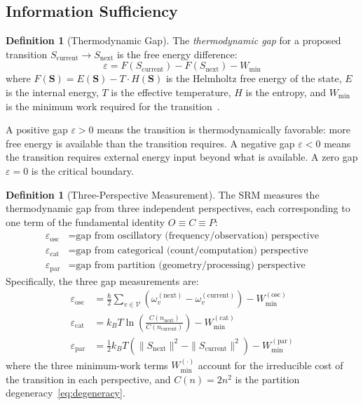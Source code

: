 \documentclass[twocolumn,10pt]{article}
\theoremstyle{definition}
\newtheorem{definition}[theorem]{Definition}
\newcommand{\Sentropy}{\mathbf{S}}
\newcommand{\Scurrent}{S_{\mathrm{current}}}
\newcommand{\Snext}{S_{\mathrm{next}}}
\begin{document}
\subsection{Information Sufficiency}

\begin{definition}[Thermodynamic Gap]
\label{def:thermo-gap}
The \emph{thermodynamic gap} for a proposed transition $\Scurrent \to \Snext$ is the free energy difference:
\begin{equation}
\varepsilon = F(\Scurrent) - F(\Snext) - W_{\mathrm{min}}
\end{equation}
where $F(\Sentropy) = E(\Sentropy) - T \cdot H(\Sentropy)$ is the Helmholtz free energy of the state, $E$ is the internal energy, $T$ is the effective temperature, $H$ is the entropy, and $W_{\mathrm{min}}$ is the minimum work required for the transition~\cite{landauer1961,bennett1982,jaynes1957}.
\end{definition}

A positive gap $\varepsilon > 0$ means the transition is thermodynamically favorable: more free energy is available than the transition requires. A negative gap $\varepsilon < 0$ means the transition requires external energy input beyond what is available. A zero gap $\varepsilon = 0$ is the critical boundary.

\begin{definition}[Three-Perspective Measurement]
\label{def:three-perspective}
The SRM measures the thermodynamic gap from three independent perspectives, each corresponding to one term of the fundamental identity $O \equiv C \equiv P$:
\begin{align}
\varepsilon_{\mathrm{osc}} &= \text{gap from oscillatory (frequency/observation) perspective} \label{eq:eps-osc} \\
\varepsilon_{\mathrm{cat}} &= \text{gap from categorical (count/computation) perspective} \label{eq:eps-cat} \\
\varepsilon_{\mathrm{par}} &= \text{gap from partition (geometry/processing) perspective} \label{eq:eps-par}
\end{align}
Specifically, the three gap measurements are:
\begin{align}
\varepsilon_{\mathrm{osc}} &= \frac{\hbar}{2}\sum_{v \in \mathcal{V}} \left(\omega_v^{(\mathrm{next})} - \omega_v^{(\mathrm{current})}\right) - W_{\mathrm{min}}^{(\mathrm{osc})} \label{eq:eps-osc-formula}\\
\varepsilon_{\mathrm{cat}} &= k_B T \ln\!\left(\frac{C(n_{\mathrm{next}})}{C(n_{\mathrm{current}})}\right) - W_{\mathrm{min}}^{(\mathrm{cat})} \label{eq:eps-cat-formula}\\
\varepsilon_{\mathrm{par}} &= \frac{1}{2}k_B T \left(\|\Snext\|^2 - \|\Scurrent\|^2\right) - W_{\mathrm{min}}^{(\mathrm{par})} \label{eq:eps-par-formula}
\end{align}
where the three minimum-work terms $W_{\mathrm{min}}^{(\cdot)}$ account for the irreducible cost of the transition in each perspective, and $C(n) = 2n^2$ is the partition degeneracy~\eqref{eq:degeneracy}.
\end{definition}
\end{document}
